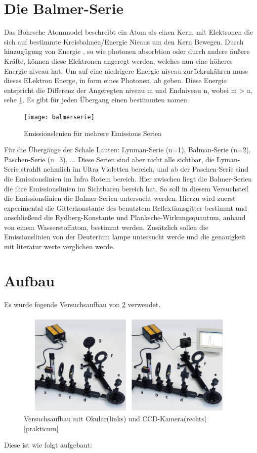 \section{Die Balmer-Serie}

Das Bohrsche Atommodel beschreibt ein Atom als einen Kern, mit Elektronen die sich auf bestimmte Kreisbahnen/Energie Nieaus um den Kern Bewegen.
Durch hinzugügung von Energie , so wie photonen absorbtion oder durch andere äußere Kräfte, können diese Elektronen angeregt werden, welches nun eine höheres Energie niveau hat. 
Um auf eine niedrigere Energie niveau zurückrukähren muss dieses ELektron Energe, in form eines Photonen, ab geben. 
Diese Energie entspricht die Differenz der Angeregten niveau m und Endniveau n, wobei m > n, sehe \cref{fig:Serien der Emissionslinien}. 
Es gibt für jeden Übergang einen bestimmten namen. 

\begin{figure}
    \centering
    \texttt{[image: balmerserie]}
    \caption{Emissionslenien für mehrere Emissions Serien}
    \label{fig:Serien der Emissionslinien}
\end{figure}

Für die Übergänge der Schale Lauten: Lynman-Serie (n=1), Balman-Serie (n=2), Paschen-Serie (n=3), ...
Diese Serien sind aber nicht alle sichtbar, die Lyman-Serie strahlt nehmlich im Ultra Violetten bereich, und ab der Paschen-Serie sind die Emissionslinien im Infra Rotem bereich.
Hier zwischen liegt die Balmer-Serien die ihre Emissionslinien im Sichtbaren bereich hat.
So soll in diesem Versuchsteil die Emissionslinien die Balmer-Serien untersucht werden. 
Hierzu wird zuerst experimental die Gitterkonstante des benutztem Reflextionsgitter bestimmt und anschließend die Rydberg-Konstante und Planksche-Wirkungsquantum, anhand von einem Wasserstoffatom, bestimmt werden.
Zusätzlich sollen die Emissionslinien von der Deuterium lampe untersucht werde und die genauigkeit mit literatur werte verglichen werde.


\section{Aufbau}

Es wurde fogende Versuchsaufbau von \cref{fig:balmeraufbau} verwendet. 

\begin{figure}[htbp]
    \centering
    \includegraphics[width=0.7\linewidth]{figs/aufbau_balmer_serie.png}
    \caption{Versuchsaufbau mit Okular(links) und CCD-Kamera(rechts) \ref{prakticum}}
    \label{fig:balmeraufbau}
\end{figure}
Diese ist wie folgt aufgebaut: 


